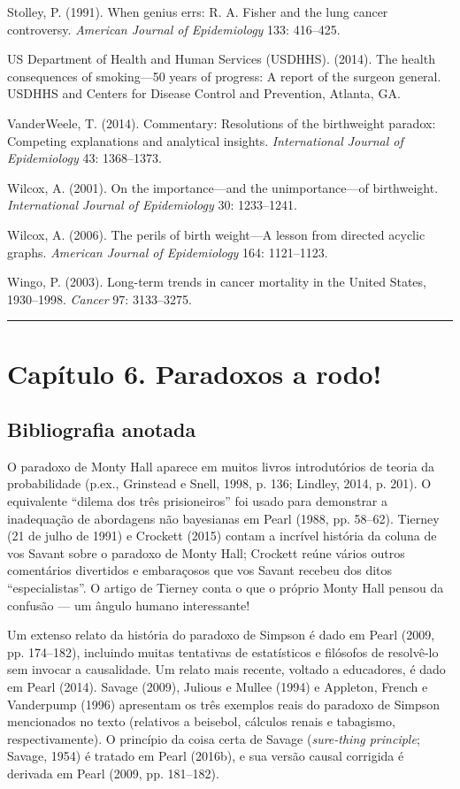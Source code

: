 \documentclass[11pt,a5paper,twoside]{book}
\begin{document}
Stolley, P. (1991). When genius errs: R. A. Fisher and the lung cancer controversy. \textit{American Journal of Epidemiology} 133: 416–425.

US Department of Health and Human Services (USDHHS). (2014). The health consequences of smoking—50 years of progress: A report of the surgeon general. USDHHS and Centers for Disease Control and Prevention, Atlanta, GA.

VanderWeele, T. (2014). Commentary: Resolutions of the birthweight paradox: Competing explanations and analytical insights. \textit{International Journal of Epidemiology} 43: 1368–1373.

Wilcox, A. (2001). On the importance—and the unimportance—of birthweight. \textit{International Journal of Epidemiology} 30: 1233–1241.

Wilcox, A. (2006). The perils of birth weight—A lesson from directed acyclic graphs. \textit{American Journal of Epidemiology} 164: 1121–1123.

Wingo, P. (2003). Long-term trends in cancer mortality in the United States, 1930–1998. \textit{Cancer} 97: 3133–3275.

\vspace{1em}\hrule\vspace{1em}
\section{Capítulo 6. Paradoxos a rodo!}
\subsection{Bibliografia anotada}
O paradoxo de Monty Hall aparece em muitos livros introdutórios de teoria da probabilidade (p.ex., Grinstead e Snell, 1998, p. 136; Lindley, 2014, p. 201). O equivalente “dilema dos três prisioneiros” foi usado para demonstrar a inadequação de abordagens não bayesianas em Pearl (1988, pp. 58–62). Tierney (21 de julho de 1991) e Crockett (2015) contam a incrível história da coluna de vos Savant sobre o paradoxo de Monty Hall; Crockett reúne vários outros comentários divertidos e embaraçosos que vos Savant recebeu dos ditos “especialistas”. O artigo de Tierney conta o que o próprio Monty Hall pensou da confusão — um ângulo humano interessante!

Um extenso relato da história do paradoxo de Simpson é dado em Pearl (2009, pp. 174–182), incluindo muitas tentativas de estatísticos e filósofos de resolvê-lo sem invocar a causalidade. Um relato mais recente, voltado a educadores, é dado em Pearl (2014). Savage (2009), Julious e Mullee (1994) e Appleton, French e Vanderpump (1996) apresentam os três exemplos reais do paradoxo de Simpson mencionados no texto (relativos a beisebol, cálculos renais e tabagismo, respectivamente). O princípio da coisa certa de Savage (\textit{sure-thing principle}; Savage, 1954) é tratado em Pearl (2016b), e sua versão causal corrigida é derivada em Pearl (2009, pp. 181–182).
\end{document}
